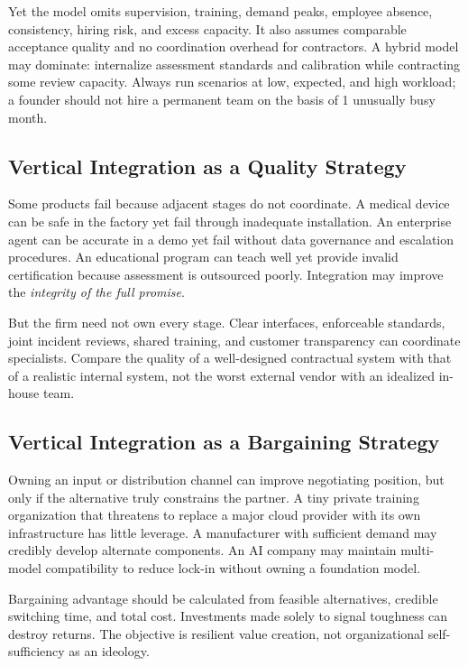 Yet the model omits supervision, training, demand peaks, employee absence, consistency, hiring risk, and excess capacity. It also assumes comparable acceptance quality and no coordination overhead for contractors. A hybrid model may dominate: internalize assessment standards and calibration while contracting some review capacity. Always run scenarios at low, expected, and high workload; a founder should not hire a permanent team on the basis of 1 unusually busy month.

\subsection{Vertical Integration as a Quality Strategy}
\label{sec:vertical_integration_quality_strategy}

Some products fail because adjacent stages do not coordinate. A medical device can be safe in the factory yet fail through inadequate installation. An enterprise agent can be accurate in a demo yet fail without data governance and escalation procedures. An educational program can teach well yet provide invalid certification because assessment is outsourced poorly. Integration may improve the \textit{integrity of the full promise}.

But the firm need not own every stage. Clear interfaces, enforceable standards, joint incident reviews, shared training, and customer transparency can coordinate specialists. Compare the quality of a well-designed contractual system with that of a realistic internal system, not the worst external vendor with an idealized in-house team.

\subsection{Vertical Integration as a Bargaining Strategy}
\label{sec:vertical_integration_bargaining_strategy}

Owning an input or distribution channel can improve negotiating position, but only if the alternative truly constrains the partner. A tiny private training organization that threatens to replace a major cloud provider with its own infrastructure has little leverage. A manufacturer with sufficient demand may credibly develop alternate components. An AI company may maintain multi-model compatibility to reduce lock-in without owning a foundation model.

Bargaining advantage should be calculated from feasible alternatives, credible switching time, and total cost. Investments made solely to signal toughness can destroy returns. The objective is resilient value creation, not organizational self-sufficiency as an ideology.

